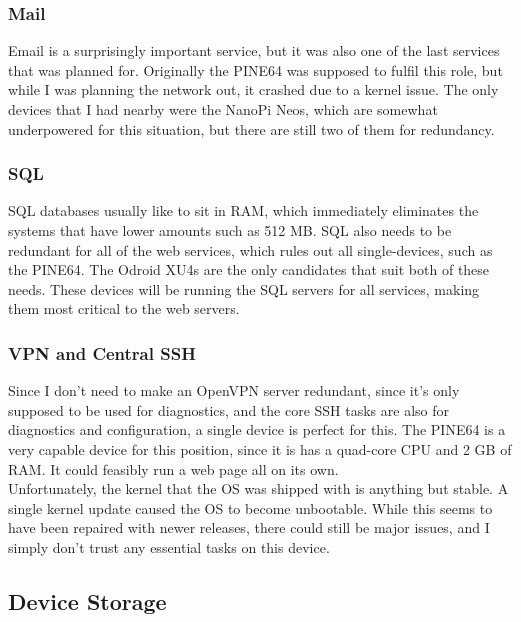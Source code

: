\documentclass[12pt]{spieman}  %
\begin{document}
\subsubsection{Mail}
\label{subsubsec:mail}

Email is a surprisingly important service, but it was also one of the last services that was planned for. Originally the PINE64 was supposed to fulfil this role, but while I was planning the network out, it crashed due to a kernel issue. The only devices that I had nearby were the NanoPi Neos, which are somewhat underpowered for this situation, but there are still two of them for redundancy.

\subsubsection{SQL}
\label{subsubsec:sql}

SQL databases usually like to sit in RAM, which immediately eliminates the systems that have lower amounts such as 512 MB. SQL also needs to be redundant for all of the web services, which rules out all single-devices, such as the PINE64. The Odroid XU4s are the only candidates that suit both of these needs. These devices will be running the SQL servers for all services, making them most critical to the web servers.

\subsubsection{VPN and Central SSH}
\label{subsubsec:vpn-ssh}

Since I don’t need to make an OpenVPN server redundant, since it’s only supposed to be used for diagnostics, and the core SSH tasks are also for diagnostics and configuration, a single device is perfect for this. The PINE64 is a very capable device for this position, since it is has a quad-core CPU and 2 GB of RAM. It could feasibly run a web page all on its own.\\

Unfortunately, the kernel that the OS was shipped with is anything but stable. A single kernel update caused the OS to become unbootable. While this seems to have been repaired with newer releases, there could still be major issues, and I simply don’t trust any essential tasks on this device.

\subsection{Device Storage}
\label{subsec:case}
\end{document}
